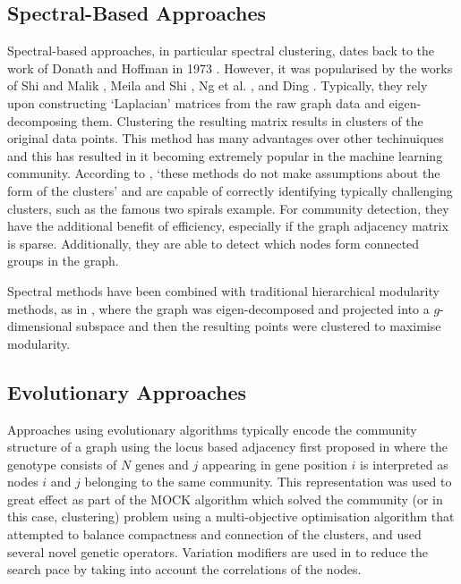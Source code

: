 \documentclass{report}
\begin{document}
\subsection{Spectral-Based Approaches}
Spectral-based approaches, in particular spectral clustering, dates back to the work of Donath and Hoffman in 1973 \cite{donath1973lower}. However, it was popularised by the works of Shi and Malik \cite{shi2000normalized}, Meila and Shi \cite{meila2001random}, Ng et al. \cite{ng2002spectral}, and Ding \cite{ding2004tutorial}. Typically, they rely upon constructing `Laplacian' matrices from the raw graph data and eigen-decomposing them. Clustering the resulting matrix results in clusters of the original data points. This method has many advantages over other techinuiques and this has resulted in it becoming extremely popular in the machine learning community. According to \cite{von2007tutorial}, `these methods do not make assumptions about the form of the clusters' and are capable of correctly identifying typically challenging clusters, such as the famous two spirals example. For community detection, they have the additional benefit of efficiency, especially if the graph adjacency matrix is sparse. Additionally, they are able to detect which nodes form connected groups in the graph.   

Spectral methods have been combined with traditional hierarchical modularity methods, as in \cite{donetti2004detecting}, where the graph was eigen-decomposed and projected into a $g$-dimensional subspace and then the resulting points were clustered to maximise modularity.

\subsection{Evolutionary Approaches}


Approaches using evolutionary algorithms typically encode the community structure of a graph using the locus based adjacency first proposed in \cite{park1998genetic} where the genotype consists of $N$ genes and $j$ appearing in gene position $i$ is interpreted as nodes $i$ and $j$ belonging to the same community. This representation was used to great effect as part of the MOCK algorithm \cite{handl2007evolutionary} which solved the community (or in this case, clustering) problem using a multi-objective optimisation algorithm that attempted to balance compactness and connection of the clusters, and used several novel genetic operators. Variation modifiers are used in \cite{pizzuti2008ga} to reduce the search pace by taking into account the correlations of the nodes.
\end{document}
